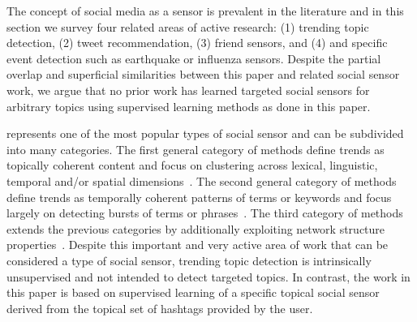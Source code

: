 %
%
%
%
%

The concept of social media as a sensor is prevalent in the literature
and in this section we survey four related areas of active research:
(1) trending topic detection, (2) tweet recommendation, (3) friend
sensors, and (4) and specific event detection such as earthquake or
influenza sensors.  Despite the partial overlap and superficial
similarities between this paper and related social sensor work, we
argue that no prior work has learned targeted social sensors for
arbitrary topics using supervised learning methods as done in this
paper.

\vspace{2mm}
 represents one of the most popular
types of social sensor and can be subdivided into many categories.  The
first general category of methods define trends as topically coherent
content and focus on clustering across lexical, linguistic, temporal
and/or spatial
dimensions~\cite{petrovic,ishikawa,murata,becker,tweetmotif,wangLee}.
The second general category of methods define trends as temporally
coherent patterns of terms or keywords and focus largely on detecting
bursts of terms or
phrases~\cite{mathioudakis,cuiZhang,zhaoSports,nichols,aiello}.
%
The third category of methods extends the previous categories by
additionally exploiting network structure properties~\cite{budak}.
Despite this important and very active area of work that can be
considered a type of social sensor, trending topic detection is
intrinsically unsupervised and not intended to detect targeted topics.
In contrast, the work in this paper is based on supervised learning of
a specific topical social sensor derived from the topical set of
hashtags provided by the user.

